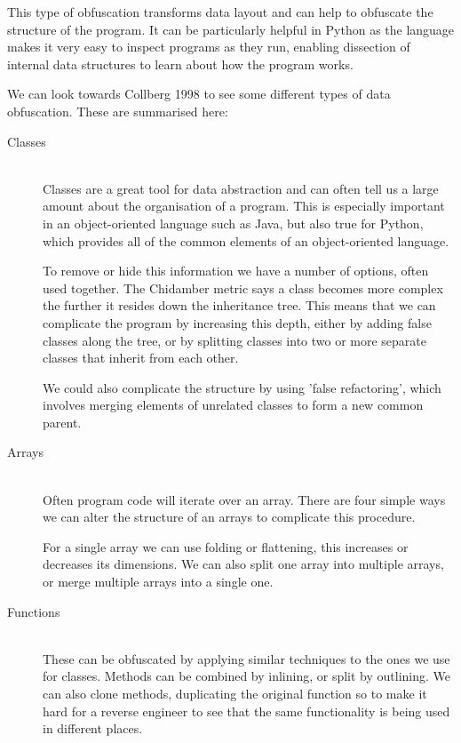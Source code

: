 \documentclass[twoside,a4paper]{report}
\begin{document}
This type of obfuscation transforms data layout and can help to obfuscate the structure of the program. It can be
particularly helpful in Python as the language makes it very easy to inspect programs as they run, enabling dissection of internal data
structures to learn about how the program works.

We can look towards Collberg 1998 \cite{dataobf} to see some different types of data obfuscation. These are summarised here:

\begin{description}
\item[Classes] \hfill \\
Classes are a great tool for data abstraction and can often tell us a large amount about the organisation of a program. This is
especially important in an object-oriented language such as Java, but also true for Python, which provides all of the common elements of
an object-oriented language.

To remove or hide this information we have a number of options, often used together. The Chidamber metric says a class becomes more complex
the further it resides down the inheritance tree. This means that we can complicate the program by increasing this depth, either by adding
false classes along the tree, or by splitting classes into two or more separate classes that inherit from each other.

We could also complicate the structure by using 'false refactoring', which involves merging elements of unrelated classes to form a new common parent.

\item[Arrays] \hfill \\
Often program code will iterate over an array. There are four simple ways we can alter the structure of an arrays to complicate
this procedure.

For a single array we can use folding or flattening, this increases or decreases its dimensions. We can also split one array into multiple
arrays, or merge multiple arrays into a single one.

\item[Functions] \hfill \\
These can be obfuscated by applying similar techniques to the ones we use for classes. Methods can be combined by inlining, or split by outlining.
We can also clone methods, duplicating the original function so to make it hard for a reverse engineer to see that the same
functionality is being used in different places.


\end{description}
\end{document}
